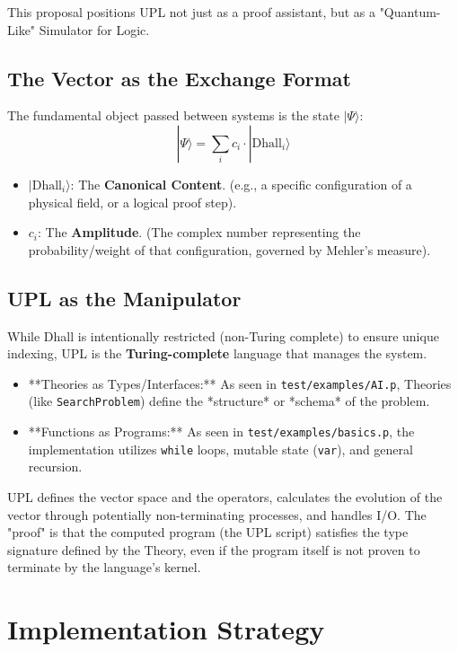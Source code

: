 \documentclass{stex}
\begin{document}
This proposal positions UPL not just as a proof assistant, but as a "Quantum-Like" Simulator for Logic.

\subsection{The Vector as the Exchange Format}
The fundamental object passed between systems is the state $|\Psi\rangle$:
\begin{equation}
|\Psi\rangle = \sum_{i} c_i \cdot | \text{Dhall}_i \rangle
\end{equation}
\begin{itemize}
    \item $| \text{Dhall}_i \rangle$: The \textbf{Canonical Content}. (e.g., a specific configuration of a physical field, or a logical proof step).
    \item $c_i$: The \textbf{Amplitude}. (The complex number representing the probability/weight of that configuration, governed by Mehler's measure).
\end{itemize}

\subsection{UPL as the Manipulator}
While Dhall is intentionally restricted (non-Turing complete) to ensure unique indexing, UPL is the \textbf{Turing-complete} language that manages the system.
\begin{itemize}
    \item **Theories as Types/Interfaces:** As seen in \texttt{test/examples/AI.p}, Theories (like \texttt{SearchProblem}) define the *structure* or *schema* of the problem.
    \item **Functions as Programs:** As seen in \texttt{test/examples/basics.p}, the implementation utilizes \texttt{while} loops, mutable state (\texttt{var}), and general recursion.
\end{itemize}
UPL defines the vector space and the operators, calculates the evolution of the vector through potentially non-terminating processes, and handles I/O. The "proof" is that the computed program (the UPL script) satisfies the type signature defined by the Theory, even if the program itself is not proven to terminate by the language's kernel.

\section{Implementation Strategy}
\end{document}

